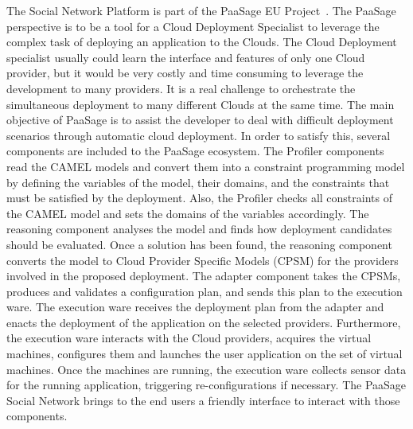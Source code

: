 The Social Network Platform is part of the PaaSage EU Project~\cite{paasage}.
The PaaSage perspective is to be a tool for a Cloud Deployment Specialist to leverage the complex task of deploying an application to the Clouds. The Cloud Deployment specialist usually could learn the interface and features of only one Cloud provider, but it would be very costly and time consuming to leverage the development to many providers. It is a real challenge to orchestrate the simultaneous deployment to many different Clouds at the same time. The main objective of PaaSage is to assist the developer to deal with difficult deployment scenarios through automatic cloud deployment. In order to satisfy this, several components are included to the PaaSage ecosystem. The Profiler components read the CAMEL models and convert them into a constraint programming model by defining the variables of the model, their domains, and the constraints that must be satisfied by the deployment. Also, the Profiler checks all constraints of the CAMEL model and sets the domains of the variables accordingly. The reasoning component analyses the model and finds how deployment candidates should be evaluated. Once a solution has been found, the reasoning component converts the model to Cloud Provider Specific Models (CPSM) for the providers involved in the proposed deployment. The adapter component takes the CPSMs, produces and validates a configuration plan, and sends this plan to the execution ware. The execution ware receives the deployment plan from the adapter and enacts the deployment of the application on the selected providers. Furthermore, the execution ware interacts with the Cloud providers, acquires the virtual machines, configures them and launches the user application on the set of virtual machines. Once the machines are running, the execution ware collects sensor data for the running application, triggering re-configurations if necessary.
The PaaSage Social Network brings to the end users a friendly interface to interact with those components.



